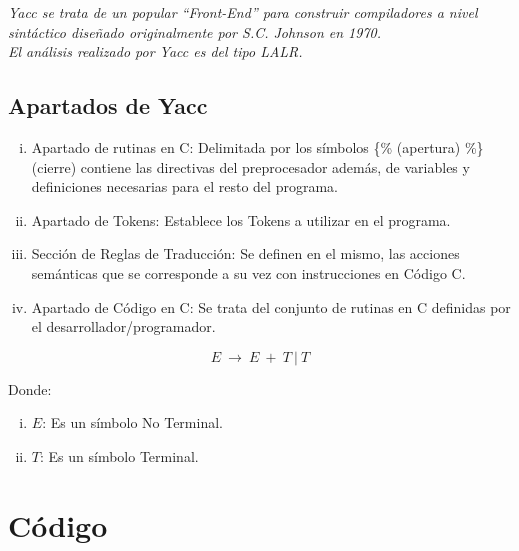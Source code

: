 \documentclass{beamer}
\theoremstyle{definition}
\theoremstyle{remark}
\begin{document}
\begin{frame}
\textit{Yacc se trata de un popular ``Front-End'' para construir compiladores a nivel sintáctico diseñado originalmente por S.C. Johnson en 1970.\\
El análisis realizado por Yacc es del tipo LALR. }
\end{frame}

\subsection{Apartados de Yacc}

\begin{frame}
\begin{enumerate}[i.]

\item Apartado de rutinas en C: Delimitada por los símbolos \{\% (apertura) \%\} (cierre) contiene las directivas del preprocesador además, de variables y definiciones necesarias para el resto del programa.

\item Apartado de Tokens: Establece los Tokens a utilizar en el programa. 

\item Sección de Reglas de Traducción: Se definen en el mismo, las acciones semánticas que se corresponde a su vez con instrucciones en Código C.

\item Apartado de Código en C: Se trata del conjunto de rutinas en C definidas por el desarrollador/programador. 

\end{enumerate}
\end{frame}

\begin{frame}
\begin{equation}
E\ \longrightarrow \ E\ +\ T\ |\ T
\end{equation}

Donde:

\begin{enumerate}[i.]

\item $E$: Es un símbolo No Terminal.

\item $T$: Es un símbolo Terminal.

\end{enumerate} 
\end{frame}


\section{Código}
\end{document}
